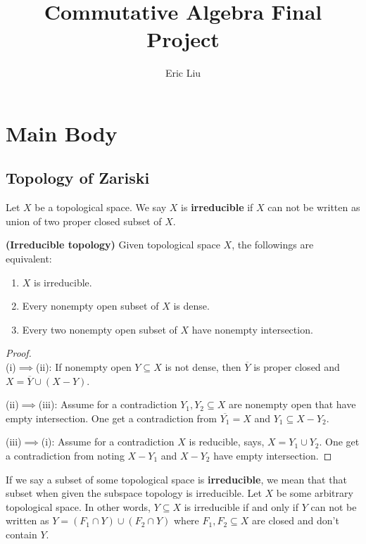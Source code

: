 \documentclass{report}
\title{Commutative Algebra Final Project}
\author{Eric Liu}
\date{}
\begin{document}
\maketitle
\newpage%

\tableofcontents
\pagebreak
\chapter{Main Body}
\section{Topology of Zariski}
Let $X$ be a topological space. We say $X$ is \textbf{irreducible} if $X$ can not be written as union of two proper closed subset of $X$.    
\begin{equiv_def}
\label{irrtop}
\textbf{(Irreducible topology)} Given topological space $X$, the followings are equivalent: 
\begin{enumerate}[label=(\roman*)]
  \item $X$ is irreducible. 
  \item Every nonempty open subset of $X$ is dense. 
  \item Every two nonempty open subset of $X$ have nonempty intersection. 
\end{enumerate}
\end{equiv_def}
\begin{proof}
$\hspace{3cm}$
  \\
(i)$\implies $(ii): If nonempty open $Y\subseteq X$ is not dense, then $\overline{Y}$ is proper closed and $X=\overline{Y}\cup (X-Y)$.

(ii)$\implies $(iii): Assume for a contradiction $Y_1,Y_2\subseteq X$ are nonempty open that have empty intersection. One get a contradiction from  $\overline{Y_1}=X$ and $Y_1\subseteq X-Y_2$.

(iii)$\implies $(i): Assume for a contradiction $X$ is reducible, says, $X=Y_1\cup Y_2$. One get a contradiction from noting $X-Y_1$ and $X-Y_2$ have empty intersection. 
\end{proof}
If we say a subset of some topological space is \textbf{irreducible}, we mean that that subset when given the subspace topology is irreducible. Let $X$ be some arbitrary topological space. In other words, $Y\subseteq X$ is irreducible if and only if $Y$ can not be written as  $Y=(F_1 \cap Y)\cup  (F_2\cap Y)$ where $F_1,F_2 \subseteq X$ are closed and don't contain $Y$.
\end{document}
